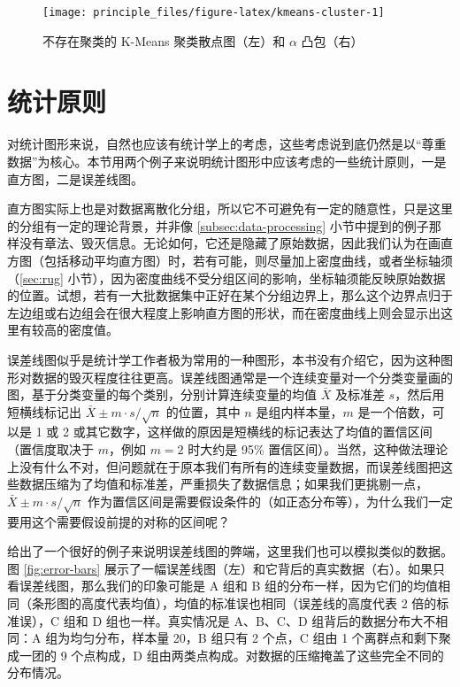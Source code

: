 \documentclass[
  b5paper,
  UTF8,twoside]{book}
\begin{document}
\begin{figure}

{\centering \texttt{[image: principle\_files/figure-latex/kmeans-cluster-1]} 

}

\caption[不存在聚类的 K-Means 聚类散点图和 \(\alpha\) 凸包]{不存在聚类的 K-Means 聚类散点图（左）和 \(\alpha\) 凸包（右）}\label{fig:kmeans-cluster}
\end{figure}





\section{统计原则}\label{ux7edfux8ba1ux539fux5219}

对统计图形来说，自然也应该有统计学上的考虑，这些考虑说到底仍然是以``尊重数据''为核心。本节用两个例子来说明统计图形中应该考虑的一些统计原则，一是直方图，二是误差线图。

直方图实际上也是对数据离散化分组，所以它不可避免有一定的随意性，只是这里的分组有一定的理论背景，并非像 \ref{subsec:data-processing} 小节中提到的例子那样没有章法、毁灭信息。无论如何，它还是隐藏了原始数据，因此我们认为在画直方图（包括移动平均直方图）时，若有可能，则尽量加上密度曲线，或者坐标轴须（\ref{sec:rug} 小节），因为密度曲线不受分组区间的影响，坐标轴须能反映原始数据的位置。试想，若有一大批数据集中正好在某个分组边界上，那么这个边界点归于左边组或右边组会在很大程度上影响直方图的形状，而在密度曲线上则会显示出这里有较高的密度值。

误差线图似乎是统计学工作者极为常用的一种图形，本书没有介绍它，因为这种图形对数据的毁灭程度往往更高。误差线图通常是一个连续变量对一个分类变量画的图，基于分类变量的每个类别，分别计算连续变量的均值 \(\bar{X}\) 及标准差 \(s\)，然后用短横线标记出 \(\bar{X}\pm m\cdot s/\sqrt{n}\) 的位置，其中 \(n\) 是组内样本量，\(m\) 是一个倍数，可以是 1 或 2 或其它数字，这样做的原因是短横线的标记表达了均值的置信区间（置信度取决于 \(m\)，例如 \(m=2\) 时大约是 95\% 置信区间）。当然，这种做法理论上没有什么不对，但问题就在于原本我们有所有的连续变量数据，而误差线图把这些数据压缩为了均值和标准差，严重损失了数据信息；如果我们更挑剔一点，\(\bar{X}\pm m\cdot s/\sqrt{n}\) 作为置信区间是需要假设条件的（如正态分布等），为什么我们一定要用这个需要假设前提的对称的区间呢？

\citet{Koyama10} 给出了一个很好的例子来说明误差线图的弊端，这里我们也可以模拟类似的数据。图 \ref{fig:error-bars} 展示了一幅误差线图（左）和它背后的真实数据（右）。如果只看误差线图，那么我们的印象可能是 A 组和 B 组的分布一样，因为它们的均值相同（条形图的高度代表均值），均值的标准误也相同（误差线的高度代表 2 倍的标准误），C 组和 D 组也一样。真实情况是 A、B、C、D 组背后的数据分布大不相同：A 组为均匀分布，样本量 20，B 组只有 2 个点，C 组由 1 个离群点和剩下聚成一团的 9 个点构成，D 组由两类点构成。对数据的压缩掩盖了这些完全不同的分布情况。
\end{document}
